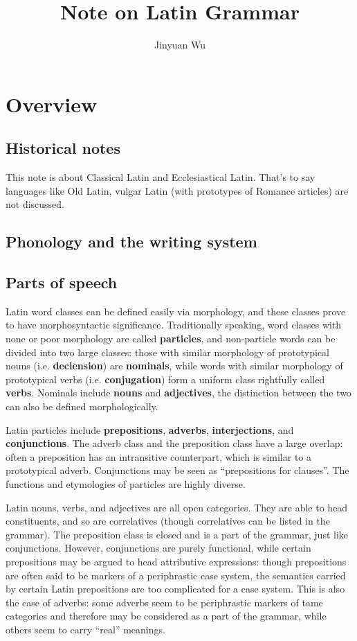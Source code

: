 \documentclass[UTF8, a4paper, oneside, scheme=plain]{ctexrep}
\title{Note on Latin Grammar}
\author{Jinyuan Wu}
\newcommand*{\concept}[1]{\textbf{#1}}
\begin{document}
\maketitle

\chapter{Overview}

\section{Historical notes}

This note is about Classical Latin and Ecclesiastical Latin.
That's to say languages like Old Latin, vulgar Latin (with prototypes of Romance articles)
are not discussed.

\section{Phonology and the writing system}

\section{Parts of speech}

Latin word classes can be defined easily via morphology,
and these classes prove to have morphosyntactic significance.
Traditionally speaking, 
word classes with none or poor morphology are called \concept{particles},
and non-particle words can be divided into two large classes:
those with similar morphology of prototypical nouns (i.e. \concept{declension}) are \concept{nominals},
while words with similar morphology of prototypical verbs (i.e. \concept{conjugation})
form a uniform class rightfully called \concept{verbs}.
Nominals include \concept{nouns} and \concept{adjectives},
the distinction between the two can also be defined morphologically.

Latin particles include \concept{prepositions}, \concept{adverbs},
\concept{interjections}, and \concept{conjunctions}.
The adverb class and the preposition class have a large overlap:
often a preposition has an intransitive counterpart,
which is similar to a prototypical adverb.
Conjunctions may be seen as ``prepositions for clauses''.
The functions and etymologies of particles are highly diverse.

Latin nouns, verbs, and adjectives are all open categories.
They are able to head constituents,
and so are correlatives (though correlatives can be listed in the grammar).
The preposition class is closed and is a part of the grammar,
just like conjunctions.
However, conjunctions are purely functional,
while certain prepositions may be argued to head attributive expressions:
though prepositions are often said to be markers of a periphrastic case system,
the semantics carried by certain Latin prepositions are too complicated for a case system.
This is also the case of adverbs:
some adverbs seem to be periphrastic markers of \acs{tame} categories
and therefore may be considered as a part of the grammar,
while others seem to carry ``real'' meanings.
\end{document}
